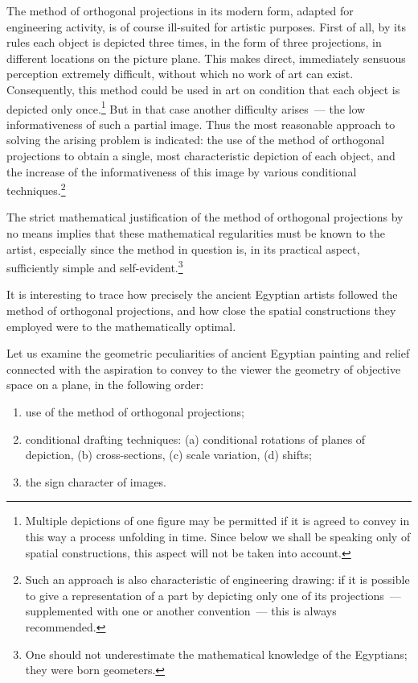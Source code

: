 The method of orthogonal projections in its modern form, adapted for engineering
activity, is of course ill-suited for artistic purposes. First of all, by its rules each object
is depicted three times, in the form of three projections, in different locations on the
picture plane. This makes direct, immediately sensuous perception extremely difficult,
without which no work of art can exist. Consequently, this method could be used in art
on condition that each object is depicted only once.\footnote{%
  Multiple depictions of one figure may be permitted if it is agreed to convey in this
  way a process unfolding in time. Since below we shall be speaking only of spatial
  constructions, this aspect will not be taken into account.}
But in that case another difficulty arises~--- the low informativeness of such a partial
image. Thus the most reasonable approach to solving the arising problem is indicated:
the use of the method of orthogonal projections to obtain a single, most characteristic
depiction of each object, and the increase of the informativeness of this image by various
conditional techniques.\footnote{%
  Such an approach is also characteristic of engineering drawing: if it is possible to give
  a representation of a part by depicting only one of its projections~--- supplemented with
  one or another convention~--- this is always recommended.}

The strict mathematical justification of the method of orthogonal projections by no
means implies that these mathematical regularities must be known to the artist, especially
since the method in question is, in its practical aspect, sufficiently simple and
self-evident.\footnote{%
  One should not underestimate the mathematical knowledge of the Egyptians; they were
  born geometers.}

It is interesting to trace how precisely the ancient Egyptian artists followed the method
of orthogonal projections, and how close the spatial constructions they employed were
to the mathematically optimal.

Let us examine the geometric peculiarities of ancient Egyptian painting and relief
connected with the aspiration to convey to the viewer the geometry of objective space
on a plane, in the following order:

\begin{enumerate}
  \item use of the method of orthogonal projections;
  \item conditional drafting techniques: (a) conditional rotations of planes of
    depiction, (b) cross-sections, (c) scale variation, (d) shifts;
  \item the sign character of images.
\end{enumerate}


